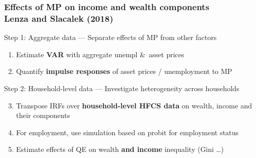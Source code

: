 \documentclass[pdflatex,aspectratio=169]{beamer}
\newcommand{\jemph}[1]{{\color{StataDarkBlue}#1}}
\newcommand{\jbemph}[1]{\textbf{\color{SlideNavy}#1}}
\begin{document}
\begin{frame}\frametitle{\bf Effects of MP on income and wealth components\\ \normalsize{Lenza and Slacalek (2018)}}

\jemph{Step 1: Aggregate data --- Separate effects of MP from other factors}
\renewcommand*{\theenumi}{\alph{enumi}}
\begin{enumerate}
\item Estimate \jbemph{VAR} with aggregate unempl \&\ asset prices
\item Quantify \jbemph{impulse responses} of asset prices / unemployment to MP\\[5mm] {}
\end{enumerate}
\jemph{Step 2: Household-level data --- Investigate heterogeneity across households}
\begin{enumerate}
\setcounter{enumi}{2}
\item Transpose IRFs over \jbemph{household-level HFCS data} on wealth, income and their components
\item For employment, use simulation based on probit for employment status
\item Estimate effects of QE on wealth \jbemph{and income} inequality (Gini \dots)
\end{enumerate}
\renewcommand*{\theenumii}{\Num{enumi}}

\end{frame}
\end{document}
